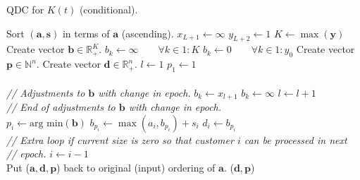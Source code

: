\documentclass[article]{jss}
\begin{document}
\begin{algorithm}[t!]
\caption{QDC for $K(t)$ (conditional).}
\label{alg:changing_servers}
\begin{algorithmic}[1]
\State Sort $(\mathbf{a}, \mathbf{s})$ in terms of $\mathbf{a}$ (ascending).
\State $x_{L+1} \leftarrow \infty$
\State $y_{L+2} \leftarrow 1$
\State $K \leftarrow \max(\mathbf{y})$
\State Create vector $\mathbf{b} \in \mathbb{R}_{\text{+}}^{K}$. 
\State $b_k \leftarrow \infty \quad \quad \forall k \in 1:K $
\State $b_k \leftarrow 0 \quad \quad \forall k \in 1:y_0 $
\State Create vector $\mathbf{p} \in \mathbb{N}^{n}$.
\State Create vector $\mathbf{d} \in \mathbb{R}_{+}^{n}$.
\State $l \leftarrow 1$
\State $p_1 \leftarrow 1$ 
 \\ \\

\hspace{10mm} \textit{// Adjustments to $\mathbf{b}$ with change in epoch.}
      	\State $b_k \leftarrow x_{l+1}$ 
      \EndFor
    \EndIf
        \State $b_k \leftarrow \infty$ 
      \EndFor
    \EndIf
    \State $l \leftarrow l + 1$
  \EndIf \\ 
 \hspace{10mm} \textit{// End of adjustments to $\mathbf{b}$ with change in epoch.} \\
  \State $p_i \leftarrow \text{arg min}(\mathbf{b}) $
  \State $b_{p_i} \leftarrow \max(a_i, b_{p_i}) + s_i $
  \State $d_i \leftarrow b_{p_i}$ \\ 
  \hspace{10mm}
  \textit{// Extra loop if current size is zero so that customer $i$ can be processed in next}\\
  \hspace{10mm}
  \textit{// epoch.}
  	\State $i \leftarrow i - 1$
  \EndIf \\
\EndFor 
\State Put ($\mathbf{a}, \mathbf{d}, \mathbf{p}$) back to original (input) ordering of $\mathbf{a}$.
\State \Return ($\mathbf{d}, \mathbf{p}$)
\EndFunction
\end{algorithmic}
\end{algorithm}
\end{document}
